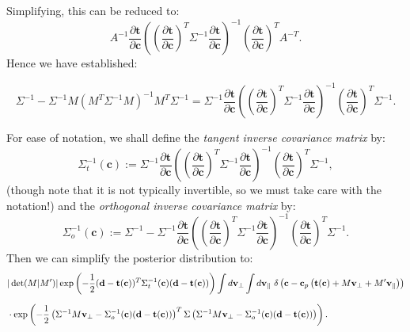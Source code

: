 \documentclass[withindex,glossary]{cam-thesis}
\renewcommand{\vec}[1]{\textbf{#1}} %
\begin{document}
Simplifying, this can be reduced to:
\begin{equation}
A^{-1} \frac{\partial \vec{t}}{\partial \vec{c}} \left( \left( \frac{\partial \vec{t}}{\partial \vec{c}} \right)^T \Sigma^{-1} \frac{\partial \vec{t}}{\partial \vec{c}}  \right)^{-1} \left( \frac{\partial \vec{t}}{\partial \vec{c}} \right)^T A^{-T}.
\end{equation}
Hence we have established:
\begin{framed}
\begin{equation}
\Sigma^{-1} - \Sigma^{-1} M (M^T\Sigma^{-1}M)^{-1} M^T \Sigma^{-1} = \Sigma^{-1} \frac{\partial \vec{t}}{\partial \vec{c}} \left( \left( \frac{\partial \vec{t}}{\partial \vec{c}} \right)^T \Sigma^{-1} \frac{\partial \vec{t}}{\partial \vec{c}}  \right)^{-1} \left( \frac{\partial \vec{t}}{\partial \vec{c}} \right)^T \Sigma^{-1}.
\end{equation}
\end{framed}
\noindent For ease of notation, we shall define the \textit{tangent inverse covariance matrix} by:
\begin{equation}
\Sigma^{-1}_t(\vec{c}) := \Sigma^{-1} \frac{\partial \vec{t}}{\partial \vec{c}} \left( \left(\frac{\partial \vec{t}}{\partial \vec{c}} \right)^T \Sigma^{-1} \frac{\partial \vec{t}}{\partial \vec{c}} \right)^{-1} \left( \frac{\partial \vec{t}}{\partial \vec{c}} \right)^T \Sigma^{-1},
\end{equation}
(though note that it is not typically invertible, so we must take care with the notation!) and the \textit{orthogonal inverse covariance matrix} by:
\begin{equation}
\Sigma^{-1}_o(\vec{c}) := \Sigma^{-1} - \Sigma^{-1} \frac{\partial \vec{t}}{\partial \vec{c}} \left( \left(\frac{\partial \vec{t}}{\partial \vec{c}} \right)^T \Sigma^{-1} \frac{\partial \vec{t}}{\partial \vec{c}} \right)^{-1} \left( \frac{\partial \vec{t}}{\partial \vec{c}} \right)^T \Sigma^{-1}.
\end{equation}
Then we can simplify the posterior distribution to:
\begin{align}
& |\det(M|M')|\exp\left( -\frac{1}{2}(\vec{d} - \vec{t}(\vec{c}))^T\Sigma_t^{-1}(\vec{c}) (\vec{d} - \vec{t}(\vec{c})) \right) \int d\vec{v}_{\perp} \int d\vec{v}_{\parallel}\ \delta\left(\vec{c} - \vec{c}_p\left(\vec{t}(\vec{c}) + M\vec{v}_{\perp} + M'\vec{v}_{\parallel}\right) \right)\notag\\[1.5ex]
& \cdot \exp\left( -\frac{1}{2} \left(\Sigma^{-1} M \vec{v}_{\perp} - \Sigma_o^{-1}(\vec{c}) (\vec{d} - \vec{t}(\vec{c}))\right)^T \Sigma \left(\Sigma^{-1} M \vec{v}_{\perp} - \Sigma_o^{-1}(\vec{c}) (\vec{d} - \vec{t}(\vec{c}))\right) \right).
\end{align}
\end{document}
